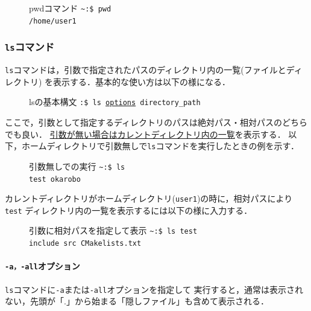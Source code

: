 \documentclass[autodetect-engine,dvi=dvipdfmx,ja=standard,a4j]{bxjsarticle}
\newcommand{\cmd}[1]{\textcolor{yellow!70!white} {#1}}
\newcommand{\dirpath}[1]{\textcolor{Cerulean}{#1}}
\newcommand{\prompt}[1]{\texttt{\dirpath{#1}:\$ }}
\newcommand{\termtext}[2]{\Large{\prompt{#1}\texttt{#2}}}
\begin{document}
\begin{figure}[H]
    \begin{terminal}{pwdコマンド}
        \termtext{\textasciitilde}{\cmd{pwd}} \\
        \texttt{/home/user1}
    \end{terminal}
\end{figure}


\subsubsection{\texttt{ls}コマンド}
\verb|ls|コマンドは，引数で指定されたパスのディレクトリ内の一覧(ファイルとディレクトリ)
を表示する．基本的な使い方は以下の様になる．

\begin{figure}[H]
    \begin{terminal}{lsの基本構文}
        \termtext{}{\cmd{ls} \underline{options} directory\_path}
    \end{terminal}
\end{figure}

ここで，引数として指定するディレクトリのパスは絶対パス・相対パスのどちらでも良い．
\underline{引数が無い場合はカレントディレクトリ内の一覧}を表示する．
以下，ホームディレクトリで引数無しで\verb|ls|コマンドを実行したときの例を示す．

\begin{figure}[H]
    \begin{terminal}{引数無しでの実行}
        \termtext{\textasciitilde}{\cmd{ls}} \\
        \texttt{\textcolor{dircolor}{test okarobo}}
    \end{terminal}
\end{figure}

カレントディレクトリがホームディレクトリ(\verb|user1|)の時に，相対パスにより\verb|test|
ディレクトリ内の一覧を表示するには以下の様に入力する．

\begin{figure}[H]
    \begin{terminal}{引数に相対パスを指定して表示}
        \termtext{\textasciitilde}{\cmd{ls} test} \\
        \texttt{\textcolor{dircolor}{include src} CMakelists.txt}
    \end{terminal}
\end{figure}

\paragraph*{ \texttt{-a，-all}オプション}
\verb|ls|コマンドに\verb|-a|または\verb|-all|オプションを指定して
実行すると，通常は表示されない，先頭が「.」から始まる「隠しファイル」も含めて表示される．
\end{document}
